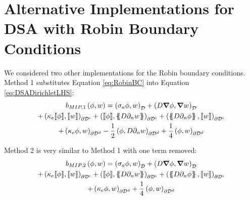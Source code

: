 \documentclass{article}
\begin{document}
\section{Alternative Implementations for DSA with Robin Boundary Conditions}
\label{sec:AltImpDSARobinBCs}
We considered two other implementations for the Robin boundary conditions. Method 1 substitutes Equation \ref{eq:RobinBC} into Equation \ref{eq:DSADirichletLHS}:
\begin{multline}
b_{MIP,1} \left( \phi, w \right) = \left( \sigma_a \phi, w \right)_\mathcal{D} + \left( D \grad \phi, \grad w \right)_\mathcal{D} \\
+ \left( \kappa_e \llbracket \phi \rrbracket, \llbracket w \rrbracket \right)_{\partial \mathcal{D}^i}
+ \left( \llbracket \phi \rrbracket , \left\{\!\!\left\{ D \partial_n w \right\} \!\! \right\} \right)_{\partial \mathcal{D}^i} + \left( \left\{ \!\! \left\{ D \partial_n \phi \right\} \!\! \right\} , \llbracket w \rrbracket \right)_{\partial \mathcal{D}^i} \\
+ \left(\kappa_e \phi, w \right)_{\partial \mathcal{D}^d}
- \frac{1}{2} \left(\phi, D \partial_n w \right)_{\partial \mathcal{D}^d}
+ \frac{1}{4} \left(\phi, w \right)_{\partial \mathcal{D}^d}
\label{eq:Method1}
\end{multline}

Method 2 is very similar to Method 1 with one term removed:
\begin{multline}
b_{MIP,2} \left( \phi, w \right) = \left( \sigma_a \phi, w \right)_\mathcal{D} + \left( D \grad \phi, \grad w \right)_\mathcal{D} \\
+ \left( \kappa_e \llbracket \phi \rrbracket, \llbracket w \rrbracket \right)_{\partial \mathcal{D}^i}
+ \left( \llbracket \phi \rrbracket , \left\{\!\!\left\{ D \partial_n w \right\} \!\! \right\} \right)_{\partial \mathcal{D}^i} + \left( \left\{ \!\! \left\{ D \partial_n \phi \right\} \!\! \right\} , \llbracket w \rrbracket \right)_{\partial \mathcal{D}^i} \\
+ \left(\kappa_e \phi, w \right)_{\partial \mathcal{D}^d}
+ \frac{1}{4} \left(\phi, w \right)_{\partial \mathcal{D}^d}
\label{eq:Method2}
\end{multline}
\end{document}
